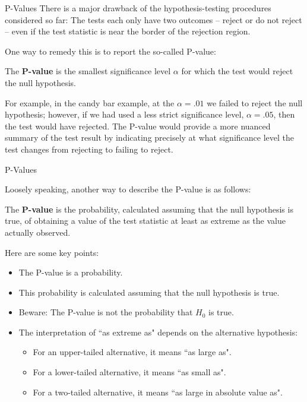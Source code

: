 \documentclass{beamer}
\renewcommand{\emph}{\textbf}
\begin{document}
\begin{frame}{P-Values}
There is a major drawback of the hypothesis-testing procedures considered so far:
The tests each only have two outcomes -- reject or do not reject -- even if the test statistic is near the border of the rejection region. 

\vspace{.2cm}
\pause One way to remedy this is to report the so-called P-value:

\begin{block}{}
The \emph{P-value} is the smallest significance level $\alpha$ for which the test would reject the null hypothesis.
\end{block}

\pause For example, in the candy bar example, at the $\alpha=.01$ we failed to reject the null hypothesis; however, if we had used a less strict significance level, $\alpha=.05$, then the test would have rejected. \pause The P-value would provide a more nuanced summary of the test result by indicating precisely at what significance level the test changes from rejecting to failing to reject.
\end{frame}

\begin{frame}{P-Values}

Loosely speaking, another way to describe the P-value is as follows:
\begin{block}{}
The \emph{P-value} is the probability, calculated assuming that the null hypothesis is
true, of obtaining a value of the test statistic at least as extreme as the value actually observed.
\end{block}
\pause
Here are some key points:
\begin{itemize}
\item The P-value is a probability.
\pause \item This probability is calculated assuming that the null hypothesis is true.
\pause \item Beware: The P-value is not the probability that $H_0$ is true.
\pause \item The interpretation of ``as extreme as" depends on the alternative hypothesis:
\begin{itemize}
\item For an upper-tailed alternative, it means ``as large as".
\item For a lower-tailed alternative, it means ``as small as".
\item For a two-tailed alternative, it means ``as large in absolute value as".
 \end{itemize}
\end{itemize}
\end{frame}
\end{document}
